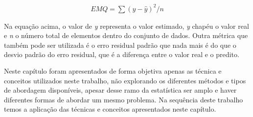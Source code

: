 \begin{align*}
  EMQ = \sum (y - \hat{y})^{2} / n
\end{align*}

Na equação acima, o valor de \textit{y} representa o valor estimado,
\textit{y} chapéu o valor real e \textit{n} o número total de elementos dentro do
conjunto de dados. Outra métrica que também pode ser utilizada é o erro residual
padrão que nada mais é do que o desvio padrão do erro residual, que é a diferença
entre o valor real e o predito.



Neste capítulo foram apresentados de forma objetiva apenas as técnica e
conceitos utilizados neste trabalho, não explorando os diferentes métodos e tipos de
abordagem disponíveis, apesar desse ramo da estatística ser amplo e haver diferentes formas
de abordar um mesmo problema. Na sequência deste trabalho temos a aplicação das
técnicas e conceitos apresentados neste capítulo.
